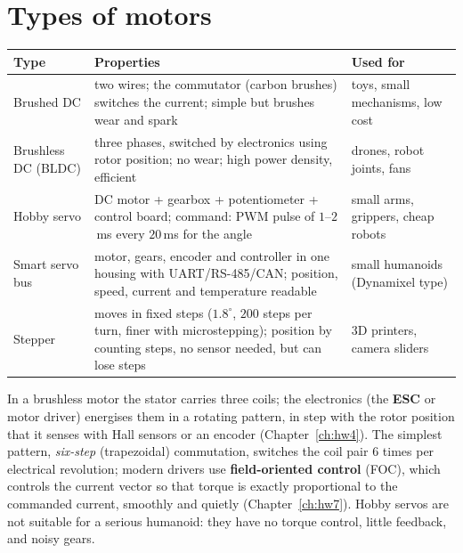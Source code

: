\section*{Types of motors}
\begin{center}
\renewcommand{\arraystretch}{1.25}
\begin{tabular}{p{3.0cm}p{5.2cm}p{4.8cm}}
\textbf{Type} & \textbf{Properties} & \textbf{Used for}\\ \hline
Brushed DC & two wires; the commutator (carbon brushes) switches the current; simple but brushes wear and spark & toys, small mechanisms, low cost\\
Brushless DC (BLDC) & three phases, switched by electronics using rotor position; no wear; high power density, efficient & drones, robot joints, fans\\
Hobby servo & DC motor + gearbox + potentiometer + control board; command: PWM pulse of $1$--$2$\,ms every $20$\,ms for the angle & small arms, grippers, cheap robots\\
Smart servo bus & motor, gears, encoder and controller in one housing with UART/RS-485/CAN; position, speed, current and temperature readable & small humanoids (Dynamixel type)\\
Stepper & moves in fixed steps ($1.8^\circ$, $200$ steps per turn, finer with microstepping); position by counting steps, no sensor needed, but can lose steps & 3D printers, camera sliders\\
\end{tabular}
\end{center}
In a brushless motor the stator carries three coils; the electronics (the \textbf{ESC} or motor driver) energises them in a rotating pattern, in step with the rotor position that it senses with Hall sensors or an encoder (Chapter~\ref{ch:hw4}). The simplest pattern, \emph{six-step} (trapezoidal) commutation, switches the coil pair $6$ times per electrical revolution; modern drivers use \textbf{field-oriented control} (FOC), which controls the current vector so that torque is exactly proportional to the commanded current, smoothly and quietly (Chapter~\ref{ch:hw7}). Hobby servos are not suitable for a serious humanoid: they have no torque control, little feedback, and noisy gears.

